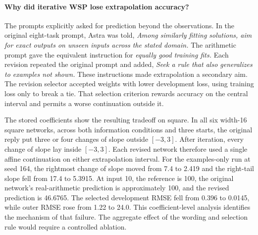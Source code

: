 \paragraph{Why did iterative WSP lose extrapolation accuracy?}
The prompts explicitly asked for prediction beyond the observations. In the original eight-task prompt, Astra was told, \emph{Among similarly fitting solutions, aim for exact outputs on unseen inputs across the stated domain.} The arithmetic prompt gave the equivalent instruction for \emph{equally good training fits.} Each revision repeated the original prompt and added, \emph{Seek a rule that also generalizes to examples not shown.} These instructions made extrapolation a secondary aim. The revision selector accepted weights with lower development loss, using training loss only to break a tie. That selection criterion rewards accuracy on the central interval and permits a worse continuation outside it.

The stored coefficients show the resulting tradeoff on square. In all six width-16 square networks, across both information conditions and three starts, the original reply put three or four changes of slope outside $[-3,3]$. After iteration, every change of slope lay inside $[-3,3]$. Each revised network therefore used a single affine continuation on either extrapolation interval. For the examples-only run at seed 164, the rightmost change of slope moved from 7.4 to 2.419 and the right-tail slope fell from 17.4 to 5.3915. At input 10, the reference is 100, the original network's real-arithmetic prediction is approximately 100, and the revised prediction is 46.6765. The selected development RMSE fell from 0.396 to 0.0145, while outer RMSE rose from 1.22 to 24.0. This coefficient-level analysis identifies the mechanism of that failure. The aggregate effect of the wording and selection rule would require a controlled ablation.
